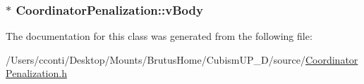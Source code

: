 \subsubsection[{v\+Body}]{ $\ast$ Coordinator\+Penalization\+::v\+Body\hspace{0.3cm}{\ttfamily [protected]}}\label{class_coordinator_penalization_a0e387ed3e8f65a876de9e44dcd866c58}


The documentation for this class was generated from the following file\+:\begin{DoxyCompactItemize}
\item 
/\+Users/cconti/\+Desktop/\+Mounts/\+Brutus\+Home/\+Cubism\+U\+P\+\_\+D/source/\hyperlink{_coordinator_penalization_8h}{Coordinator\+Penalization.\+h}\end{DoxyCompactItemize}

